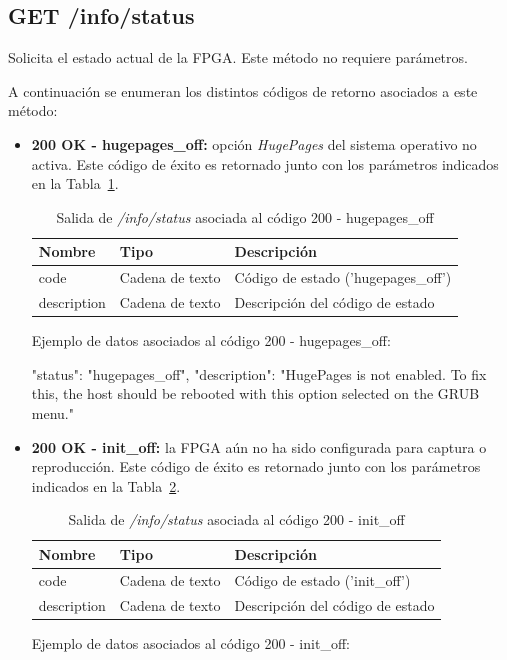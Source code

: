 %
%
\subsection{GET /info/status}
Solicita el estado actual de la \gls{FPGA}.
Este método no requiere parámetros.

A continuación se enumeran los distintos códigos de retorno asociados a este método:
\begin{itemize}

\item{\textbf{200 OK - hugepages\_off:} opción \textit{HugePages} del sistema operativo no activa.
Este código de éxito es retornado junto con los parámetros indicados en la Tabla~\ref{extra:api:infostatus:hugepagesoff}.
\begin{table}[H]
\centering
\begin{tabular}{|l|l|l|}
\hline
\rowcolor[HTML]{F5F5F5}
\textbf{Nombre}  & \textbf{Tipo}   & \textbf{Descripción}               \\ \hline
code             & Cadena de texto & Código de estado ('hugepages\_off') \\ \hline
description      & Cadena de texto & Descripción del código de estado   \\ \hline
\end{tabular}
\caption{Salida de \textit{/info/status} asociada al código 200 - hugepages\_off}
\label{extra:api:infostatus:hugepagesoff}
\end{table}
\begin{minipage}{\textwidth}
Ejemplo de datos asociados al código 200 - hugepages\_off:

\begin{code}[language=json]
{
  "status": "hugepages_off",
  "description": "HugePages is not enabled. To fix this, the host should be rebooted with this option selected on the GRUB menu."
}
\end{code}
\end{minipage}
}

\item{\textbf{200 OK - init\_off:} la \gls{FPGA} aún no ha sido configurada para captura o reproducción.
Este código de éxito es retornado junto con los parámetros indicados en la Tabla~\ref{extra:api:infostatus:initoff}.
\begin{table}[H]
\centering
\begin{tabular}{|l|l|l|}
\hline
\rowcolor[HTML]{F5F5F5}
\textbf{Nombre}  & \textbf{Tipo}   & \textbf{Descripción}               \\ \hline
code             & Cadena de texto & Código de estado ('init\_off')     \\ \hline
description      & Cadena de texto & Descripción del código de estado   \\ \hline
\end{tabular}
\caption{Salida de \textit{/info/status} asociada al código 200 - init\_off}
\label{extra:api:infostatus:initoff}
\end{table}
\begin{minipage}{\textwidth}
Ejemplo de datos asociados al código 200 - init\_off:


\end{minipage}}
\end{itemize}
